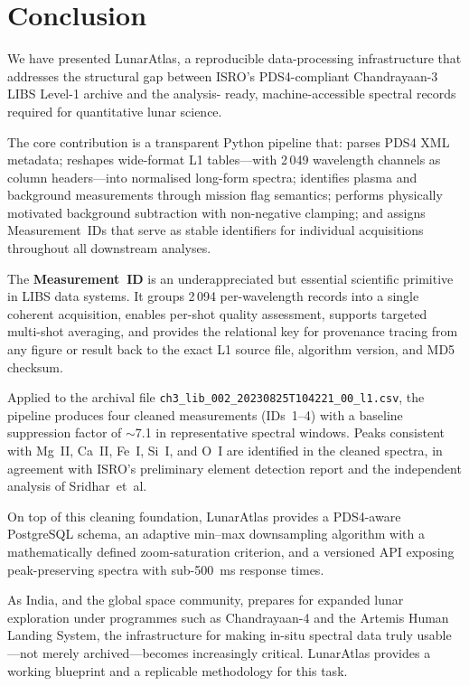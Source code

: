 \documentclass[a4paper,twocolumn,10pt]{article}
\begin{document}
\section{Conclusion}
\label{sec:conclusion}

We have presented LunarAtlas, a reproducible data-processing
infrastructure that addresses the structural gap between ISRO's
PDS4-compliant Chandrayaan-3 LIBS Level-1 archive and the analysis-
ready, machine-accessible spectral records required for quantitative
lunar science.

The core contribution is a transparent Python pipeline that: parses
PDS4 XML metadata; reshapes wide-format L1 tables---with 2\,049
wavelength channels as column headers---into normalised long-form
spectra; identifies plasma and background measurements through mission
flag semantics; performs physically motivated background subtraction
with non-negative clamping; and assigns Measurement~IDs that serve as
stable identifiers for individual acquisitions throughout all
downstream analyses.

The \textbf{Measurement~ID} is an underappreciated but essential
scientific primitive in LIBS data systems.  It groups 2\,094
per-wavelength records into a single coherent acquisition, enables
per-shot quality assessment, supports targeted multi-shot averaging,
and provides the relational key for provenance tracing from any figure
or result back to the exact L1 source file, algorithm version, and
MD5 checksum.

Applied to the archival file
\texttt{ch3\_lib\_002\_20230825T104221\_00\_l1.csv}, the pipeline
produces four cleaned measurements (IDs~1--4) with a baseline
suppression factor of $\sim$7.1 in representative spectral windows.
Peaks consistent with Mg~II, Ca~II, Fe~I, Si~I, and O~I are
identified in the cleaned spectra, in agreement with ISRO's
preliminary element detection report and the independent analysis of
Sridhar~et~al.

On top of this cleaning foundation, LunarAtlas provides a PDS4-aware
PostgreSQL schema, an adaptive min--max downsampling algorithm with
a mathematically defined zoom-saturation criterion, and a versioned
API exposing peak-preserving spectra with sub-\SI{500}{\milli\second}
response times.

As India, and the global space community, prepares for expanded lunar
exploration under programmes such as Chandrayaan-4 and the Artemis
Human Landing System, the infrastructure for making in-situ spectral
data truly usable---not merely archived---becomes increasingly
critical.  LunarAtlas provides a working blueprint and a replicable
methodology for this task.
\end{document}
